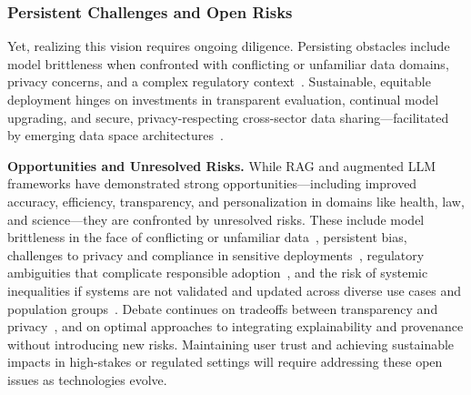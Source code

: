 \documentclass[sigconf]{acmart}
\begin{document}
\subsubsection{Persistent Challenges and Open Risks}

Yet, realizing this vision requires ongoing diligence. Persisting obstacles include model brittleness when confronted with conflicting or unfamiliar data domains, privacy concerns, and a complex regulatory context~\cite{ref4, ref36, ref40, ref48}. Sustainable, equitable deployment hinges on investments in transparent evaluation, continual model upgrading, and secure, privacy-respecting cross-sector data sharing—facilitated by emerging data space architectures~\cite{ref34, ref39, ref50}.

\vspace{2mm}
\noindent
\textbf{Opportunities and Unresolved Risks.} While RAG and augmented LLM frameworks have demonstrated strong opportunities—including improved accuracy, efficiency, transparency, and personalization in domains like health, law, and science—they are confronted by unresolved risks. These include model brittleness in the face of conflicting or unfamiliar data~\cite{ref9}, persistent bias, challenges to privacy and compliance in sensitive deployments~\cite{ref36,ref48}, regulatory ambiguities that complicate responsible adoption~\cite{ref4,ref50}, and the risk of systemic inequalities if systems are not validated and updated across diverse use cases and population groups~\cite{ref5}. Debate continues on tradeoffs between transparency and privacy~\cite{ref36}, and on optimal approaches to integrating explainability and provenance without introducing new risks. Maintaining user trust and achieving sustainable impacts in high-stakes or regulated settings will require addressing these open issues as technologies evolve.
\end{document}

